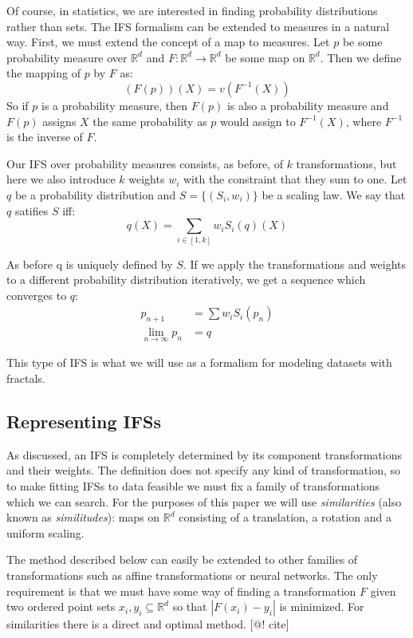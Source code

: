 \documentclass[11pt]{article}
\theoremstyle{definition}
\begin{document}
Of course, in statistics, we are interested in finding probability distributions rather than sets. The IFS formalism can be extended to measures in a natural way. First, we must extend the concept of a map to measures. Let $p$ be some probability measure over ${\mathbb R}^d$ and $F:{\mathbb R}^d \rightarrow {\mathbb R}^d$ be some map on ${\mathbb R}^d$. Then we define the mapping of $p$ by $F$ as:
\[
(F(p))(X) = v(F^{-1}(X))
\]
So if $p$ is a probability measure, then $F(p)$ is also a probability measure and $F(p)$ assigns $X$ the same probability as $p$ would assign to $F^{-1}(X)$, where $F^{-1}$ is the inverse of $F$.

Our IFS over probability measures consists, as before, of $k$ transformations, but here we also introduce $k$ weights $w_i$ with the constraint that they sum to one. Let $q$ be a probability distribution and $S = \{(S_i, w_i)\}$ be a scaling law. We say that $q$ satifies $S$ iff:
\[
q(X) = \sum_{i\in[1, k]} w_i S_i(q)(X)
\] 

As before q is uniquely defined by $S$. If we apply the transformations and weights to a different probability distribution iteratively, we get a sequence which converges to $q$:
\begin{align*}
p_{n+1} &= \sum w_i S_i(p_n) \\
\lim_{n \rightarrow \infty} p_n &= q 
\end{align*}

This type of IFS is what we will use as a formalism for modeling datasets with fractals.

\subsection{Representing IFSs}

As discussed, an IFS is completely determined by its component transformations and their weights. The definition does not specify any kind of transformation, so to make fitting IFSs to data feasible we must fix a family of transformations which we can search. For the purposes of this paper we will use \emph{similarities} (also known as \emph{similitudes}): maps on ${\mathbb R}^d$ consisting of a translation, a rotation and a uniform scaling.

The method described below can easily be extended to other families of transformations such as affine transformations or neural networks. The only requirement is that we must have some way of finding a transformation $F$ given two ordered point sets ${x_i}, {y_i} \subseteq {\mathbb R}^d$ so that $|F(x_i) - y_i|$ is minimized. For similarities there is a direct and optimal method. [@! cite]
\end{document}
